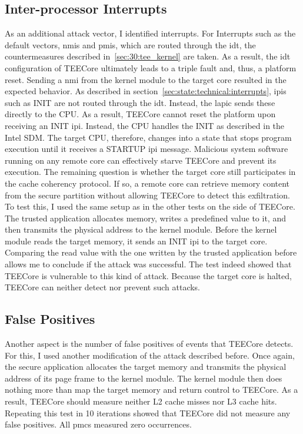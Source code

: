 \subsection{Inter-processor Interrupts}
\label{sec:evaluation:ipi}
As an additional attack vector, I identified interrupts. For Interrupts such as
the default vectors, \glspl{nmi} and \glspl{pmi}, which are routed through the
\gls{idt}, the countermeasures described in~\ref{sec:30:tee_kernel} are taken.
As a result, the \gls{idt} configuration of TEECore ultimately leads to a triple
fault and, thus, a platform reset. Sending a \gls{nmi} from the kernel module to
the target core resulted in the expected behavior. As described in
section~\ref{sec:state:technical:interrupts}, \glspl{ipi} such as INIT are not
routed through the \gls{idt}. Instead, the \gls{lapic} sends these directly to
the CPU. As a result, TEECore cannot reset the platform upon receiving an INIT
\gls{ipi}. Instead, the CPU handles the INIT as described in the Intel SDM. The
target CPU, therefore, changes into a state that stops program execution until
it receives a STARTUP \gls{ipi} message. Malicious system software running on
any remote core can effectively starve TEECore and prevent its execution. The
remaining question is whether the target core still participates in the cache
coherency protocol. If so, a remote core can retrieve memory content from the
secure partition without allowing TEECore to detect this exfiltration. To test
this, I used the same setup as in the other tests on the side of TEECore. The
trusted application allocates memory, writes a predefined value to it, and then
transmits the physical address to the kernel module. Before the kernel module
reads the target memory, it sends an INIT \gls{ipi} to the target core.
Comparing the read value with the one written by the trusted application before
allows me to conclude if the attack was successful. The test indeed showed that
TEECore is vulnerable to this kind of attack. Because the target core is halted,
TEECore can neither detect nor prevent such attacks.

\subsection{False Positives}
\label{sec:evaluation:fp}
Another aspect is the number of false positives of events that TEECore detects.
For this, I used another modification of the attack described before. Once
again, the secure application allocates the target memory and transmits the
physical address of its page frame to the kernel module. The kernel module then
does nothing more than map the target memory and return control to TEECore. As a
result, TEECore should measure neither L2 cache misses nor L3 cache hits.
Repeating this test in 10 iterations showed that TEECore did not measure any
false positives. All \glspl{pmc} measured zero occurrences.\\

